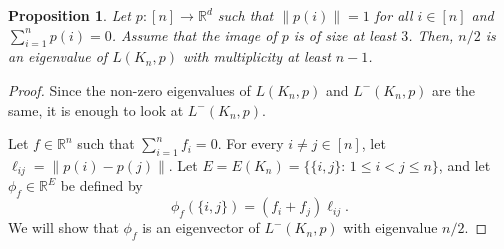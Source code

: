 \documentclass[a4paper,11pt]{article}
\theoremstyle{plain}
\newtheorem{proposition}[theorem]{\bf Proposition}
\theoremstyle{definition}
\newcommand{\Rea}{{\mathbb R}}
\begin{document}
\begin{proposition}\label{prop:large_eigenvalues_balanced_p}
Let $p:[n]\to\Rea^d$ such that $\|p(i)\|=1$ for all $i\in[n]$ and $\sum_{i=1}^n p(i)=0$. Assume that the image of $p$ is of size at least $3$. Then, $n/2$ is an eigenvalue of $L(K_n,p)$ with multiplicity at least $n-1$.
\end{proposition}
\begin{proof}
Since the non-zero eigenvalues of $L(K_n,p)$ and $L^{-}(K_n,p)$ are the same, it is enough to look at $L^{-}(K_n,p)$. 

Let $f\in \Rea^n$ such that $\sum_{i=1}^n f_i=0$. 
For every $i\neq j\in[n]$, let $\ell_{ij}=\|p(i)-p(j)\|$. Let $E=E(K_n)=\{\{i,j\}:\, 1\leq i<j\leq n\}$, and let $\phi_f \in \Rea^E$ be defined by
\[
    \phi_f(\{i,j\})=(f_i+f_j) \ell_{ij}.
\]
We will show that $\phi_f$ is an eigenvector of $L^{-}(K_n,p)$ with eigenvalue $n/2$.


\end{proof}
\end{document}
